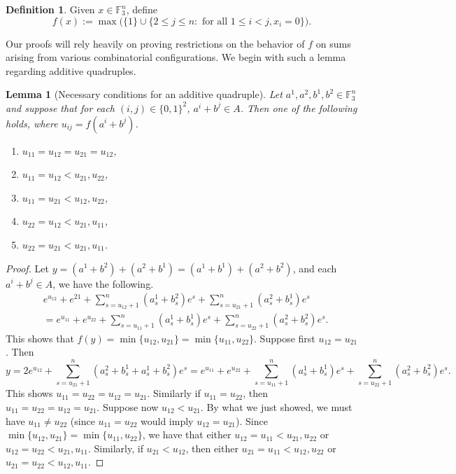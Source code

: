 \documentclass[12pt,oneside,british,a4wide]{amsart}
\newtheorem{lemma}[theorem]{Lemma}
\numberwithin{equation}{section}
\theoremstyle{definition}
\newtheorem{definition}[theorem]{Definition}
\def\F{\mathbb{F}}
\begin{document}
\begin{definition}
Given $x\in \F_3^n$, define
$$
f(x):=\max\Big( \{1\}\cup \{2\leq j\leq n: \text{ for all }1\leq i< j, x_i=0\}\Big).
$$
\end{definition}

Our proofs will rely heavily on proving restrictions on the behavior of $f$ on sums arising from various combinatorial configurations.  We begin with such a lemma regarding additive quadruples. 

\begin{lemma}[Necessary conditions for an additive quadruple]\label{lem:c4}
Let $a^1,a^2,b^1,b^2\in \mathbb{F}_3^n$ and suppose that for each $(i,j)\in \{0,1\}^2$, $a^i+b^j\in A$.  Then one of the following holds, where $u_{ij}=f(a^i+b^j)$.
\begin{enumerate}[label=\normalfont(\roman*)]
\item $u_{11}=u_{12}=u_{21}=u_{12}$,
\item $u_{11}=u_{12}<u_{21},u_{22}$,
\item $u_{11}=u_{21}<u_{12},u_{22}$,
\item $u_{22}=u_{12}<u_{21},u_{11}$,
\item $u_{22}=u_{21}<u_{21},u_{11}$.
\end{enumerate}
\end{lemma}
\begin{proof}
Let $y=(a^1+b^2)+(a^2+b^1)=(a^1+b^1)+(a^2+b^2)$, and each $a^i+b^j\in A$, we have the following.
\begin{align*}
&e^{u_{12}}+ e^{21}+\sum_{s=u_{12}+1}^n (a^1_s+b^2_s) e^s +\sum_{s=u_{21}+1}^n(a^2_s+b^1_s)e^s\\
&=e^{u_{11}}+ e^{u_{22}}+\sum_{s=u_{11}+1}^n (a^1_s+b^1_s) e^s + \sum_{s=u_{22}+1}^n(a^2_s+b^2_s)e^s.
\end{align*}
This shows that $f(y)=\min\{u_{12},u_{21}\}=\min\{u_{11},u_{22}\}$.  Suppose first $u_{12}=u_{21}$.  Then 
$$
y=2e^{u_{12}}+\sum_{s=u_{21}+1}^n(a^2_s+b^1_s+a^1_s+b^2_s)e^s=e^{u_{11}}+ e^{u_{22}}+\sum_{s=u_{11}+1}^n (a^1_s+b^1_s) e^s + \sum_{s=u_{22}+1}^n(a^2_s+b^2_s)e^s.
$$
This shows $u_{11}=u_{22}=u_{12}=u_{21}$.  Similarly if $u_{11}=u_{22}$, then $u_{11}=u_{22}=u_{12}=u_{21}$.   Suppose now $u_{12}<u_{21}$.  By what we just showed, we must have $u_{11}\neq u_{22}$ (since $u_{11}=u_{22}$ would imply $u_{12}=u_{21}$).  Since $\min\{u_{12},u_{21}\}=\min\{u_{11},u_{22}\}$, we have that either $u_{12}=u_{11}<u_{21},u_{22}$ or $u_{12}=u_{22}<u_{21},u_{11}$.  Similarly, if $u_{21}<u_{12}$, then either $u_{21}=u_{11}<u_{12},u_{22}$ or $u_{21}=u_{22}<u_{12},u_{11}$.  
\end{proof}
\end{document}
